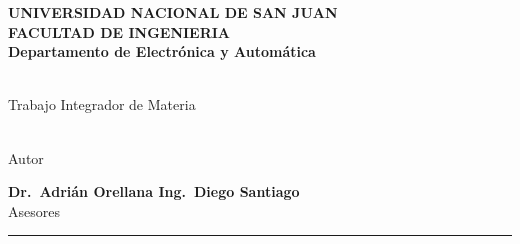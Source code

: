 \begin{titlepage}
  \begin{center}
    \begin{Large}
      \textbf{UNIVERSIDAD NACIONAL DE SAN JUAN\\
      \vspace*{0.05in}
      FACULTAD DE INGENIERIA\\
      \vspace*{0.05in}
      Departamento de Electrónica y Automática\\
      \vspace*{\fill}}
    \end{Large}
    \begin{Large}
      \textbf{\MakeUppercase{\thetitle}} \\
      Trabajo Integrador de Materia\\
    \end{Large}
    \vspace*{\fill}
    \begin{large}
      \textbf{\theauthor}\\
      Autor\\
    \end{large}
    \vspace*{0.5in}
    \begin{large}
      \textbf{Dr.~Adrián Orellana \hspace*{\fill}
      Ing.~Diego Santiago\\}
      Asesores\\
    \end{large}
    \vspace{\fill}
    \rule{80mm}{0.1mm}\\
    \vspace{.1in}
    \the\year
  \end{center}

\end{titlepage}
